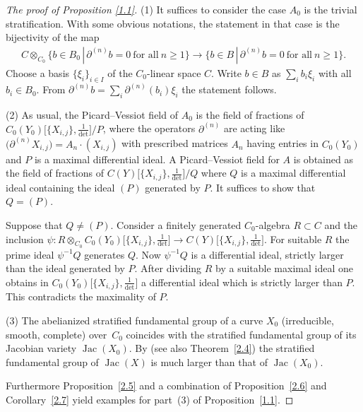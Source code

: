 \documentclass[10pt,a4paper]{amsart}
\numberwithin{equation}{section}
\begin{document}
\begin{proof}[The proof of Proposition \ref{1.1}]
(1) It suffices to consider the case $A_0$ is the trivial stratification. With some obvious notations,
 the statement in that case is the bijectivity of the map
\begin{gather*}
C\otimes_{C_0}\big\{b\in B_0\,|\, \partial ^{(n)}b=0 \ \text{for all} \ n\geq 1\big\}\rightarrow \big\{ b\in B \,|\, \partial^{(n)}b=0
\ \text{for all} \ n\geq 1\big\}.
\end{gather*}
Choose a basis $\{\xi_i\}_{i\in I}$ of the $C_0$-linear space $C$. Write $b\in B$ as $\sum _ib_i\xi_i$ with all $b_i\in B_0$. From $\partial^{(n)}b=\sum _i \partial^{(n)}(b_i)\xi_i$ the statement follows.

(2) As usual, the Picard--Vessiot field of $A_0$ is the field of fractions of $C_0(Y_0)\big[\{X_{i,j}\},\frac{1}{\det}\big]/P$, where the operators $\partial ^{(n)}$ are acting like $\big(\partial ^{(n)}X_{i,j}\big)=A_n\cdot (X_{i,j})$ with prescribed matrices $A_n$ having entries in $C_0(Y_0)$ and $P$ is a maximal differential ideal. A Picard--Vessiot field for $A$ is obtained as the field of fractions of $C(Y)\big[\{X_{i,j}\},\frac{1}{\det}\big]/Q$ where $Q$ is a maximal differential ideal containing the ideal $(P)$ generated
 by $P$. It suffices to show that $Q=(P)$.

Suppose that $Q\neq (P)$. Consider a finitely generated $C_0$-algebra $R\subset C$ and the inclusion $\psi\colon R\otimes _{C_0}C_0(Y_0)\big[\{X_{i,j}\}, \frac{1}{\det}\big]\rightarrow C(Y)\big[\{X_{i,j}\},\frac{1}{\det}\big]$. For suitable $R$ the prime ideal $\psi^{-1}Q$ gene\-ra\-tes $Q$. Now $\psi^{-1}Q$ is a differential ideal, strictly larger than the ideal generated by $P$. After dividing $R$ by a suitable maximal ideal one obtains in $C_0(Y_0)\big[\{X_{i,j}\},\frac{1}{\det}\big]$ a differential ideal which is strictly larger than $P$. This contradicts the maximality of $P$.

(3) The abelianized stratified fundamental group of a curve $X_0$ (irreducible, smooth, complete) over~$C_0$ coincides with the stratified fundamental group of its Jacobian variety $\operatorname{Jac}(X_0)$. By \cite[Theorem~21]{Sa} (see also Theorem~\ref{2.4}) the stratified fundamental group of $\operatorname{Jac}(X)$ is much larger than that of $\operatorname{Jac}(X_0)$.

Furthermore Proposition~\ref{2.5} and a combination of Proposition~\ref{2.6} and Corollary~\ref{2.7} yield examples for part~(3) of Proposition~\ref{1.1}.
\end{proof}
\end{document}
